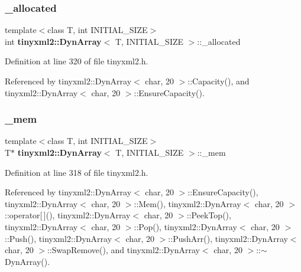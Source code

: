 \subsubsection{\_allocated}
{\footnotesize\ttfamily template$<$class T, int I\+N\+I\+T\+I\+A\+L\+\_\+\+S\+I\+ZE$>$ \\
int \textbf{ tinyxml2\+::\+Dyn\+Array}$<$ T, I\+N\+I\+T\+I\+A\+L\+\_\+\+S\+I\+ZE $>$\+::\+\_\+allocated\hspace{0.3cm}{\ttfamily [private]}}



Definition at line 320 of file tinyxml2.\+h.



Referenced by tinyxml2\+::\+Dyn\+Array$<$ char, 20 $>$\+::\+Capacity(), and tinyxml2\+::\+Dyn\+Array$<$ char, 20 $>$\+::\+Ensure\+Capacity().

\mbox{\label{classtinyxml2_1_1_dyn_array_ac8511e876d55f3ec64277516273434fd}} 
\subsubsection{\_mem}
{\footnotesize\ttfamily template$<$class T, int I\+N\+I\+T\+I\+A\+L\+\_\+\+S\+I\+ZE$>$ \\
T$\ast$ \textbf{ tinyxml2\+::\+Dyn\+Array}$<$ T, I\+N\+I\+T\+I\+A\+L\+\_\+\+S\+I\+ZE $>$\+::\+\_\+mem\hspace{0.3cm}{\ttfamily [private]}}



Definition at line 318 of file tinyxml2.\+h.



Referenced by tinyxml2\+::\+Dyn\+Array$<$ char, 20 $>$\+::\+Ensure\+Capacity(), tinyxml2\+::\+Dyn\+Array$<$ char, 20 $>$\+::\+Mem(), tinyxml2\+::\+Dyn\+Array$<$ char, 20 $>$\+::operator[$\,$](), tinyxml2\+::\+Dyn\+Array$<$ char, 20 $>$\+::\+Peek\+Top(), tinyxml2\+::\+Dyn\+Array$<$ char, 20 $>$\+::\+Pop(), tinyxml2\+::\+Dyn\+Array$<$ char, 20 $>$\+::\+Push(), tinyxml2\+::\+Dyn\+Array$<$ char, 20 $>$\+::\+Push\+Arr(), tinyxml2\+::\+Dyn\+Array$<$ char, 20 $>$\+::\+Swap\+Remove(), and tinyxml2\+::\+Dyn\+Array$<$ char, 20 $>$\+::$\sim$\+Dyn\+Array().

\mbox{\label{classtinyxml2_1_1_dyn_array_a26ed1f7dab98229d2ed867a07ee427df}} 
